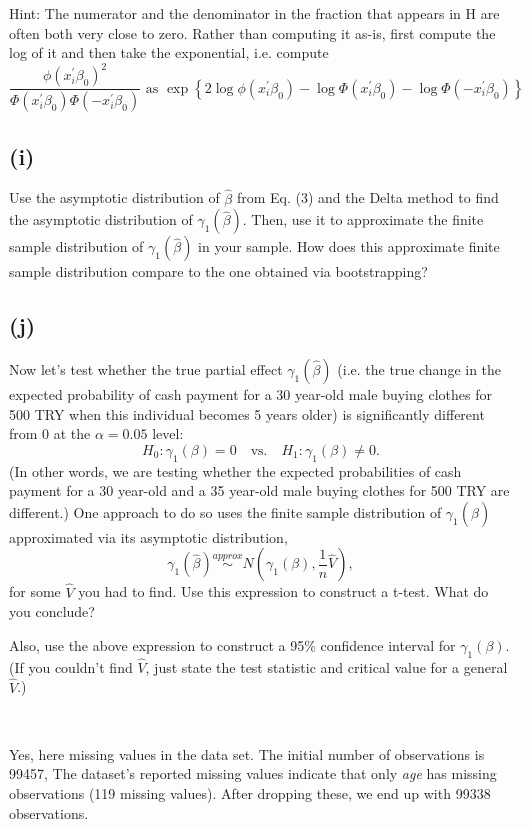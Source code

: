 \documentclass[a4paper,12pt]{article} %
\theoremstyle{nonitalic}
\newenvironment{solution}[1]
  {\renewcommand\theinnercustomsol{#1}\innercustomsol}
  {\endinnercustomsol}
\newcounter{solutionctr}[section]
\renewcommand{\thesolutionctr}{(\alph{solutionctr})}
\newenvironment{autosolution}
  {\stepcounter{solutionctr}\begin{solution}{\thesolutionctr}}
  {\end{solution}}
\begin{document}
Hint: The numerator and the denominator in the fraction that appears in H are often both
very close to zero. Rather than computing it as-is, first compute the log of it and then take
the exponential, i.e. compute 
\[
\frac{\phi(x_i^{\prime} \beta_0)^2}{\Phi(x_i^{\prime} \beta_0)\Phi(-x_i^{\prime} \beta_0)} \text{ as } \exp\left\{ 2\log \phi(x_{i}^{\prime} \beta_0) - \log \Phi(x_i^{\prime} \beta_0) - \log \Phi(-x_i^{\prime} \beta_0) \right\}
\]

\subsection*{(i)}
Use the asymptotic distribution of $\hat{\beta}$ from Eq. (3) and the Delta method to find the asymptotic distribution of $\gamma_1(\hat{\beta})$. 
Then, use it to approximate the finite sample distribution of $\gamma_1(\hat{\beta})$ in your sample. 
How does this approximate finite sample distribution compare to the one obtained via bootstrapping?

\subsection*{(j)}
Now let's test whether the true partial effect $\gamma_1(\hat{\beta})$ (i.e. the true change in the expected probability of cash payment for a 30 year-old male buying clothes for 500 TRY when this individual becomes 5 years older) is significantly different from 0 at the $\alpha = 0.05$ level:
\[
H_0 : \gamma_1(\beta) = 0 \quad \text{vs.} \quad H_1 : \gamma_1(\beta) \neq 0 .
\]
(In other words, we are testing whether the expected probabilities of cash payment for a 30 year-old and a 35 year-old male buying clothes for 500 TRY are different.) One approach to do so uses the finite sample distribution of $\gamma_1(\hat{\beta})$ approximated via its asymptotic distribution,
\[
\gamma_1(\hat{\beta}) \overset{approx}{\sim} N\left( \gamma_1(\beta), \frac{1}{n} \hat{V} \right),
\]
for some $\hat{V}$ you had to find. Use this expression to construct a t-test. What do you conclude?

Also, use the above expression to construct a 95\% confidence interval for $\gamma_1(\beta)$. (If you couldn't find $\hat{V}$, just state the test statistic and critical value for a general $\hat{V}$.)

\begin{autosolution}
    \ 

    Yes, here missing values in the data set.
    The initial number of observations is 99457,
    The dataset's reported missing values indicate that only 
    \textit{age} has missing observations (119 missing values). 
    After dropping these, we end up with 99338 observations.
\end{autosolution}
\end{document}
